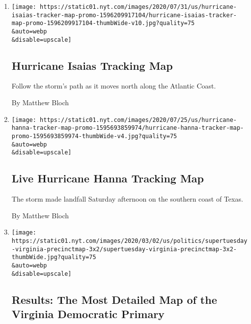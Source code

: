 \begin{enumerate}
\def\labelenumi{\arabic{enumi}.}
\item
  \href{/interactive/2020/07/31/us/hurricane-isaias-tracker-map.html}{}

  \texttt{[image: https://static01.nyt.com/images/2020/07/31/us/hurricane-isaias-tracker-map-promo-1596209917104/hurricane-isaias-tracker-map-promo-1596209917104-thumbWide-v10.jpg?quality=75\\\&auto=webp\\\&disable=upscale]}

  \hypertarget{hurricane-isaias-tracking-map}{%
  \subsection{Hurricane Isaias Tracking
  Map}\label{hurricane-isaias-tracking-map}}

  Follow the storm's path as it moves north along the Atlantic Coast.

  By Matthew Bloch
\item
  \href{/interactive/2020/07/25/us/hurricane-hanna-tracker-map.html}{}

  \texttt{[image: https://static01.nyt.com/images/2020/07/25/us/hurricane-hanna-tracker-map-promo-1595693859974/hurricane-hanna-tracker-map-promo-1595693859974-thumbWide-v4.jpg?quality=75\\\&auto=webp\\\&disable=upscale]}

  \hypertarget{live-hurricane-hanna-tracking-map}{%
  \subsection{Live Hurricane Hanna Tracking
  Map}\label{live-hurricane-hanna-tracking-map}}

  The storm made landfall Saturday afternoon on the southern coast of
  Texas.

  By Matthew Bloch
\item
  \href{/interactive/2020/03/03/us/elections/precinct-map-virginia-primary.html}{}

  \texttt{[image: https://static01.nyt.com/images/2020/03/02/us/politics/supertuesday-virginia-precinctmap-3x2/supertuesday-virginia-precinctmap-3x2-thumbWide.jpg?quality=75\\\&auto=webp\\\&disable=upscale]}

  \hypertarget{results-the-most-detailed-map-of-the-virginia-democratic-primary}{%
  \subsection{Results: The Most Detailed Map of the Virginia Democratic
  Primary}\label{results-the-most-detailed-map-of-the-virginia-democratic-primary}}


\end{enumerate}
